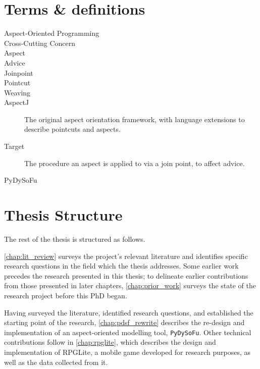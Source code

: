 \section{Terms \& definitions}\label{sec:glossary}




\begin{description}
  \item[Aspect-Oriented Programming]
  \item[Cross-Cutting Concern]
    \item[Aspect] 
    \item[Advice] 
    \item[Joinpoint]
    \item[Pointcut] 
    \item[Weaving] 
    \item[AspectJ] The original aspect orientation framework, with language
    extensions to describe pointcuts and aspects.
    \item[Target] The procedure an aspect is applied to via a join point, to
    affect advice.
    \item[PyDySoFu] 
    \item[]
\end{description}


\section{Thesis Structure}

The rest of the thesis is structured as follows. 

\cref{chap:lit_review} surveys the project's relevant literature and identifies
specific research questions in the field which the thesis addresses. Some
earlier work precedes the research presented in this thesis; to delineate
earlier contributions from those presented in later chapters,
\cref{chap:prior_work} surveys the state of the research project before this PhD
began.

Having surveyed the literature, identified research questions, and established
the starting point of the research, \cref{chap:pdsf_rewrite} describes the
re-design and implementation of an aspect-oriented modelling tool,
\lstinline{PyDySoFu}. Other technical contributions follow in
\cref{chap:rpglite}, which describes the design and implementation of RPGLite, a
mobile game developed for research purposes, as well as the data collected from
it.

